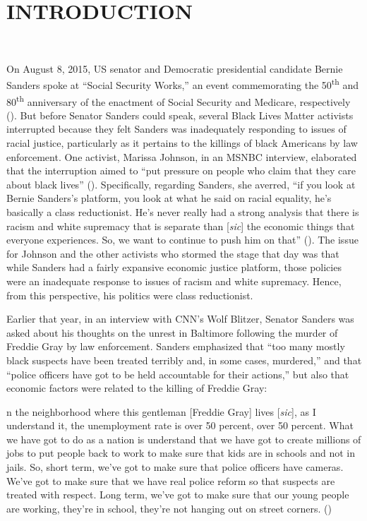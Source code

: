 \documentclass[12pt]{article}
\renewenvironment{quote}
  {\list{}{\leftmargin=\parindent\rightmargin=0pt}%
   \item\relax}
  {\endlist}
\begin{document}

\part{INTRODUCTION} \

On August 8, 2015, US senator and Democratic presidential candidate Bernie Sanders spoke at “Social Security Works,” an event commemorating the 50\textsuperscript{th} and 80\textsuperscript{th} anniversary of the enactment of Social Security and Medicare, respectively (\cite{wilsonProtestersShutBernie2015}). But before Senator Sanders could speak, several Black Lives Matter activists interrupted because they felt Sanders was inadequately responding to issues of racial justice, particularly as it pertains to the killings of black Americans by law enforcement. One activist, Marissa Johnson, in an MSNBC interview, elaborated that the interruption aimed to “put pressure on people who claim that they care about black lives” (\cite{hallBernieSandersBlack2015}). Specifically, regarding Sanders, she averred, “if you look at Bernie Sanders’s platform, you look at what he said on racial equality, he’s basically a class reductionist. He’s never really had a strong analysis that there is racism and white supremacy that is separate than [\textit{sic}] the economic things that everyone experiences. So, we want to continue to push him on that” (\cite{hallBernieSandersBlack2015}). The issue for Johnson and the other activists who stormed the stage that day was that while Sanders had a fairly expansive economic justice platform, those policies were an inadequate response to issues of racism and white supremacy. Hence, from this perspective, his politics were class reductionist.

Earlier that year, in an interview with CNN’s Wolf Blitzer, Senator Sanders was asked about his thoughts on the unrest in Baltimore following the murder of Freddie Gray by law enforcement. Sanders emphasized that “too many mostly black suspects have been treated terribly and, in some cases, murdered,” and that “police officers have got to be held accountable for their actions,” but also that economic factors were related to the killing of Freddie Gray:

\begin{quote}
[I]n the neighborhood where this gentleman [Freddie Gray] lives [\textit{sic}], as I understand it, the unemployment rate is over 50 percent, over 50 percent. What we have got to do as a nation is understand that we have got to create millions of jobs to put people back to work to make sure that kids are in schools and not in jails. So, short term, we've got to make sure that police officers have cameras. We've got to make sure that we have real police reform so that suspects are treated with respect. Long term, we've got to make sure that our young people are working, they're in school, they're not hanging out on street corners. (\cite{sandersInterviewWolfBlitzer2015})
\end{quote}
\end{document}
